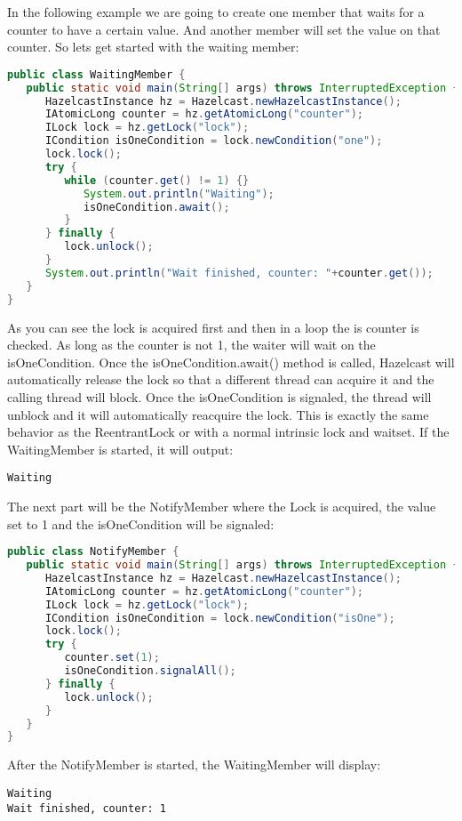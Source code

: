 In the following example we are going to create one member that waits for a counter to have a certain value. And another member will set the value on that counter. So lets get started with the waiting member:
\begin{lstlisting}[language=java]
public class WaitingMember {
   public static void main(String[] args) throws InterruptedException {
      HazelcastInstance hz = Hazelcast.newHazelcastInstance();
      IAtomicLong counter = hz.getAtomicLong("counter");
      ILock lock = hz.getLock("lock");
      ICondition isOneCondition = lock.newCondition("one");
      lock.lock();
      try {
         while (counter.get() != 1) {}
            System.out.println("Waiting");
            isOneCondition.await();
         }
      } finally {
         lock.unlock();
      }
      System.out.println("Wait finished, counter: "+counter.get());
   }
}
\end{lstlisting}
As you can see the lock is acquired first and then in a loop the is counter is checked. As long as the counter is not 1, the waiter will wait on the isOneCondition. Once the isOneCondition.await() method is called, Hazelcast will automatically release the lock so that a different thread can acquire it and the calling thread will block. Once the isOneCondition is signaled, the thread will unblock and it will automatically reacquire the lock. This is exactly the same behavior as the ReentrantLock or with a normal intrinsic lock and waitset. If the WaitingMember is started, it will output:
\begin{lstlisting}
Waiting 
\end{lstlisting}
The next part will be the NotifyMember where the Lock is acquired, the value set to 1 and the isOneCondition will be signaled: 
\begin{lstlisting}[language=java]
public class NotifyMember {
   public static void main(String[] args) throws InterruptedException {
      HazelcastInstance hz = Hazelcast.newHazelcastInstance();
      IAtomicLong counter = hz.getAtomicLong("counter");
      ILock lock = hz.getLock("lock");
      ICondition isOneCondition = lock.newCondition("isOne");
      lock.lock();
      try {
         counter.set(1);
         isOneCondition.signalAll();
      } finally {
         lock.unlock();
      }
   }
}
\end{lstlisting}
After the NotifyMember is started, the WaitingMember will display:
\begin{lstlisting}
Waiting 
Wait finished, counter: 1
\end{lstlisting}

